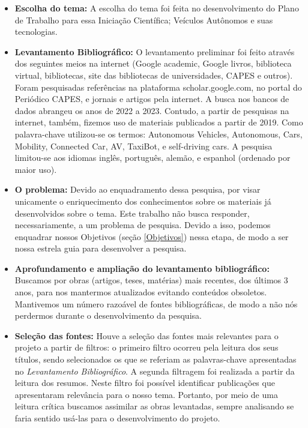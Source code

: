 \vspace {1mm}


\begin{itemize}\label{details}

\item \textbf{Escolha do tema:} A escolha do tema foi feita no desenvolvimento do Plano de Trabalho para essa Iniciação Científica; Veículos Autônomos e suas tecnologias. 

\item \textbf{Levantamento Bibliográfico:} O levantamento preliminar foi feito através dos seguintes meios na internet (Google academic, Google livros, biblioteca virtual, bibliotecas, site das bibliotecas de universidades, CAPES e outros). Foram pesquisadas referências na plataforma scholar.google.com, no portal do Periódico CAPES, e jornais e artigos pela internet. A busca nos bancos de dados abrangeu os anos de 2022 a 2023. Contudo, a partir de pesquisas na internet, também, fizemos uso de materiais publicados a partir de 2019. Como palavra-chave utilizou-se os termos: Autonomous Vehicles, Autonomous, Cars, Mobility, Connected Car, AV, TaxiBot, e self-driving cars.  A pesquisa limitou-se aos idiomas inglês, português,  alemão, e espanhol (ordenado por maior uso).


\item \textbf{O problema:} Devido ao enquadramento dessa pesquisa, por visar unicamente o enriquecimento dos conhecimentos sobre os materiais já desenvolvidos sobre o tema. Este trabalho não busca responder, necessariamente, a um problema de pesquisa. Devido a isso, podemos enquadrar nossos Objetivos (seção \ref{Objetivos}) nessa etapa, de modo a ser nossa estrela guia para desenvolver a pesquisa.

\item \textbf{Aprofundamento e ampliação do levantamento bibliográfico:} Buscamos por obras (artigos, teses, matérias) mais recentes, dos últimos 3 anos, para nos mantermos atualizados evitando conteúdos obsoletos. Mantivemos um número razoável de fontes bibliográficas, de modo a não nós perdermos durante o desenvolvimento da pesquisa. 

\item \textbf{Seleção das fontes:} Houve a seleção das fontes mais relevantes para o projeto a partir de filtros: o primeiro filtro ocorreu pela leitura dos seus títulos, sendo selecionados os que se referiam as palavras-chave apresentadas no \textit{Levantamento Bibliográfico}. A segunda filtragem foi realizada a partir da leitura dos resumos. Neste filtro foi possível identificar publicações que apresentaram relevância para o nosso tema.
Portanto, por meio de uma leitura crítica buscamos assimilar as obras levantadas, sempre analisando se faria sentido usá-las para o desenvolvimento do projeto. 


\end{itemize}
